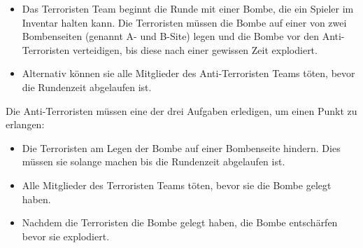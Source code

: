 \documentclass[envcountsame, envcountchap, deutsch]{i-studis}
\begin{document}
\begin{itemize}
    \item Das Terroristen Team beginnt die Runde mit einer Bombe, die ein Spieler im Inventar halten kann. 
    Die Terroristen müssen die Bombe auf einer von zwei 
    Bombenseiten (genannt A- und B-Site) legen und die Bombe vor den Anti-Terroristen verteidigen, bis diese nach einer gewissen Zeit explodiert.
    \item Alternativ können sie alle Mitglieder des Anti-Terroristen Teams töten, bevor die Rundenzeit abgelaufen ist.
\end{itemize}

Die Anti-Terroristen müssen eine der drei Aufgaben erledigen, um einen Punkt zu erlangen: 

\begin{itemize}
    \item Die Terroristen am Legen der Bombe auf einer Bombenseite hindern. Dies müssen sie solange machen bis die Rundenzeit abgelaufen ist.
    \item Alle Mitglieder des Terroristen Teams töten, bevor sie die Bombe gelegt haben.
    \item Nachdem die Terroristen die Bombe gelegt haben, die Bombe entschärfen bevor sie explodiert.
\end{itemize}
\end{document}
